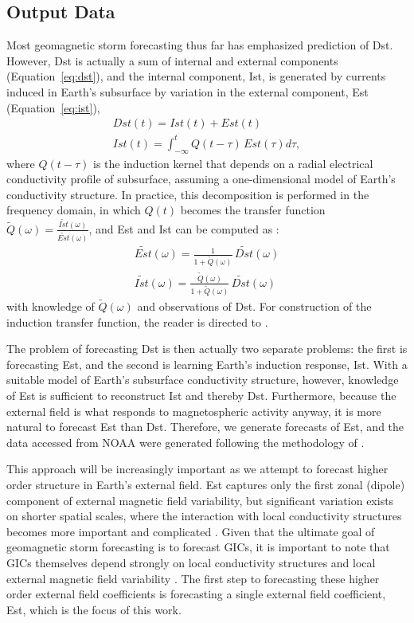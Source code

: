 \subsection{Output Data}
Most geomagnetic storm forecasting thus far has emphasized prediction of Dst. However, Dst is actually a sum of internal and external components (Equation~\ref{eq:dst}), and the internal component, Ist, is generated by currents induced in Earth's subsurface by variation in the external component, Est \citep{Maus2004} (Equation~\ref{eq:ist}),
\begin{eqnarray}
    Dst(t) = Ist(t) + Est(t) \label{eq:dst}\\
    Ist(t) = \int_{-\infty}^t Q(t-\tau)\,Est(\tau) d\tau \label{eq:ist},
\end{eqnarray}
where $Q(t-\tau)$ is the induction kernel that depends on a radial electrical conductivity profile of subsurface, assuming a one-dimensional model of Earth's conductivity structure. In practice, this decomposition is performed in the frequency domain, in which $Q(t)$ becomes the transfer function $\tilde{Q}(\omega)=\frac{\tilde{Ist}(\omega)}{\tilde{Est}(\omega)}$, and Est and Ist can be computed as \citep{Maus2004}:
\begin{eqnarray}
    \tilde{Est}(\omega) = \frac{1}{1+\tilde{Q}(\omega)}\,\tilde{Dst}(\omega) \\
    \tilde{Ist}(\omega) = \frac{\tilde{Q}(\omega)}{1+\tilde{Q}(\omega)}\,\tilde{Dst}(\omega)
\end{eqnarray}
with knowledge of $\tilde{Q}(\omega)$ and observations of Dst. For construction of the induction transfer function, the reader is directed to \cite{Maus2004}.

The problem of forecasting Dst is then actually two separate problems: the first is forecasting Est, and the second is learning Earth's induction response, Ist. With a suitable model of Earth's subsurface conductivity structure, however, knowledge of Est is sufficient to reconstruct Ist and thereby Dst. Furthermore, because the external field is what responds to magnetospheric activity anyway, it is more natural to forecast Est than Dst. Therefore, we generate forecasts of Est, and the data accessed from NOAA were generated following the methodology of \cite{Maus2004}. 

This approach will be increasingly important as we attempt to forecast higher order structure in Earth's external field. Est captures only the first zonal (dipole) component of external magnetic field variability, but significant variation exists on shorter spatial scales, where the interaction with local conductivity structures becomes more important and complicated \citep{Kelbert2020}. Given that the ultimate goal of geomagnetic storm forecasting is to forecast GICs, it is important to note that GICs themselves depend strongly on local conductivity structures and local external magnetic field variability \citep{Olsen2004, Puethe2014}. The first step to forecasting these higher order external field coefficients is forecasting a single external field coefficient, Est, which is the focus of this work.


